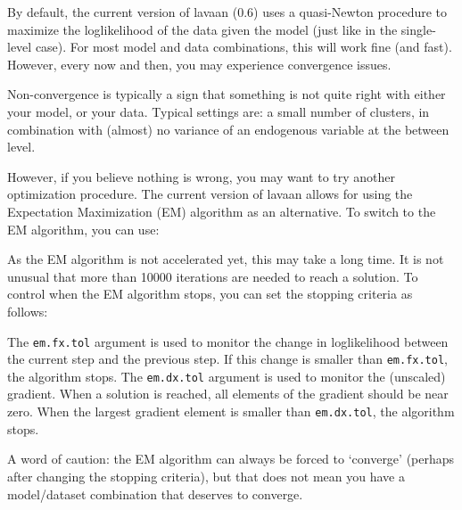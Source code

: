 By default, the current version of lavaan (0.6) uses a quasi-Newton
procedure to maximize the loglikelihood of the data given the model
(just like in the single-level case). For most model and data
combinations, this will work fine (and fast). However, every now and
then, you may experience convergence issues.

Non-convergence is typically a sign that something is not quite right
with either your model, or your data. Typical settings are: a small
number of clusters, in combination with (almost) no variance of an
endogenous variable at the between level.

However, if you believe nothing is wrong, you may want to try another
optimization procedure. The current version of lavaan allows for using
the Expectation Maximization (EM) algorithm as an alternative. To switch
to the EM algorithm, you can use:

\begin{Shaded}
\begin{Highlighting}[]
\OtherTok{\textless{}{-}} \NormalTok{(} \NormalTok{,}
            \NormalTok{, } \NormalTok{)}
\end{Highlighting}
\end{Shaded}

As the EM algorithm is not accelerated yet, this may take a long time.
It is not unusual that more than 10000 iterations are needed to reach a
solution. To control when the EM algorithm stops, you can set the
stopping criteria as follows:

\begin{Shaded}
\begin{Highlighting}[]
\OtherTok{\textless{}{-}} \NormalTok{(} \NormalTok{,}
            \NormalTok{, } \NormalTok{, } \NormalTok{,}
            \NormalTok{, } \NormalTok{)}
\end{Highlighting}
\end{Shaded}

The \texttt{em.fx.tol} argument is used to monitor the change in
loglikelihood between the current step and the previous step. If this
change is smaller than \texttt{em.fx.tol}, the algorithm stops. The
\texttt{em.dx.tol} argument is used to monitor the (unscaled) gradient.
When a solution is reached, all elements of the gradient should be near
zero. When the largest gradient element is smaller than
\texttt{em.dx.tol}, the algorithm stops.

A word of caution: the EM algorithm can always be forced to `converge'
(perhaps after changing the stopping criteria), but that does not mean
you have a model/dataset combination that deserves to converge.
